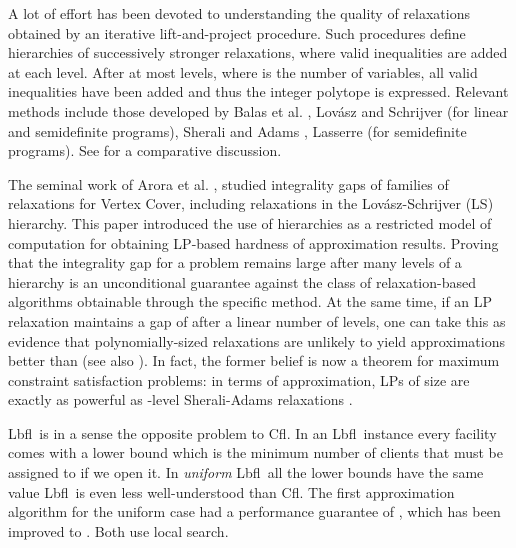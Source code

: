 \documentclass[11pt]{article}
\newcommand{\lbfl}{{\sc Lbfl}}
\newcommand{\cfl}{{\sc Cfl}}
\begin{document}
A lot of effort has been  devoted to 
understanding the quality of relaxations obtained by an iterative 
lift-and-project procedure. Such procedures define hierarchies of 
successively  stronger relaxations, where  valid inequalities are added at 
each level. After at most  levels, where  is the number of 
variables, all valid inequalities have been  added and thus the integer polytope is
expressed. Relevant methods  include those  developed  by Balas et
al. \cite{BalasCC93},  Lov\'{a}sz and Schrijver \cite{LovaszS91} (for
linear and semidefinite programs), 
Sherali and Adams \cite{SheraliA90},    Lasserre  \cite{Lasserre01}
(for semidefinite programs). 
See
\cite{laurent} for a comparative discussion.
  
 The seminal work of Arora et al.  \cite{AroraBLT06}, studied integrality
 gaps  of  families of  relaxations  for  Vertex  Cover,
 including  relaxations    in  the  Lov\'{a}sz-Schrijver  (LS)
 hierarchy.  This  paper  introduced  the  use  of  hierarchies  as  a
 restricted model  of computation  for obtaining LP-based  hardness of
 approximation  results.   Proving  that  the integrality  gap  for  a
 problem  remains  large  after  many  levels of  a  hierarchy  is  an
 unconditional  guarantee   against  the  class   of  relaxation-based
 algorithms obtainable through the specific method.  At the same time,
 if an LP  relaxation maintains a gap of  after  a linear number of
 levels,  one  can  take  this  as evidence  that  polynomially-sized
 relaxations are unlikely to yield approximations better than  (see
 also  \cite{SchoenebeckTT07}).  In fact,  the former  belief is  now a
 theorem   for   maximum    constraint   satisfaction   problems:   
  in terms of approximation,
 LPs of size 
  are exactly as powerful 
 as -level Sherali-Adams relaxations \cite{ChanLRS13}. 


 \lbfl\ is in a sense the opposite problem to \cfl. 
 In an \lbfl\ instance   every facility  comes with a  lower
bound  
which is the minimum number of clients that must be assigned
 to   if we open it. In {\em uniform} \lbfl\ all the lower bounds
have the same value   \lbfl\ is even less well-understood than \cfl. 
 The first approximation algorithm for the uniform case 
  had  a performance guarantee of
 \cite{Svitkina08}, which has been  improved  to  \cite{AhmadianS12}. 
Both use local search.
\end{document}
